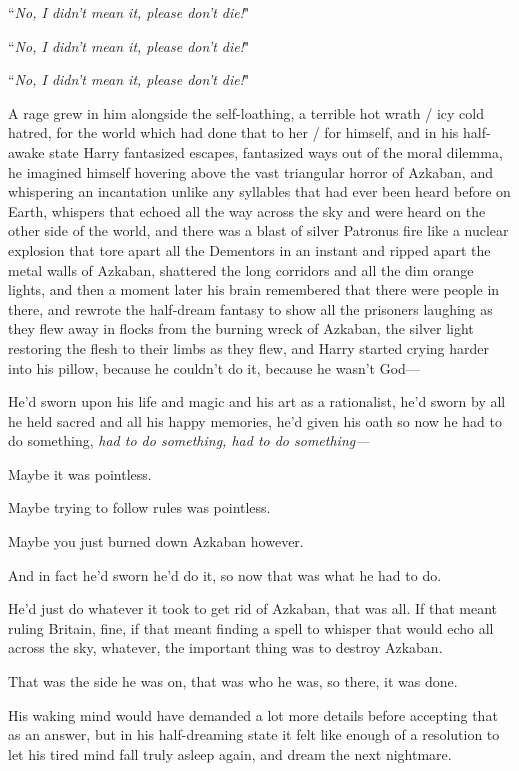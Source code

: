 ``\emph{No, I didn't mean it, please don't die!}"

``\emph{No, I didn't mean it, please don't die!}"

``\emph{No, I didn't mean it, please don't die!}"

A rage grew in him alongside the self-loathing, a terrible hot wrath / icy cold hatred, for the world which had done that to her / for himself, and in his half-awake state Harry fantasized escapes, fantasized ways out of the moral dilemma, he imagined himself hovering above the vast triangular horror of Azkaban, and whispering an incantation unlike any syllables that had ever been heard before on Earth, whispers that echoed all the way across the sky and were heard on the other side of the world, and there was a blast of silver Patronus fire like a nuclear explosion that tore apart all the Dementors in an instant and ripped apart the metal walls of Azkaban, shattered the long corridors and all the dim orange lights, and then a moment later his brain remembered that there were people in there, and rewrote the half-dream fantasy to show all the prisoners laughing as they flew away in flocks from the burning wreck of Azkaban, the silver light restoring the flesh to their limbs as they flew, and Harry started crying harder into his pillow, because he couldn't do it, because he wasn't God—

He'd sworn upon his life and magic and his art as a rationalist, he'd sworn by all he held sacred and all his happy memories, he'd given his oath so now he had to do something, \emph{had to do something, had to \emph{do something—}}

Maybe it was pointless.

Maybe trying to follow rules was pointless.

Maybe you just burned down Azkaban however.

And in fact he'd sworn he'd do it, so now that was what he had to do.

He'd just do whatever it took to get rid of Azkaban, that was all. If that meant ruling Britain, fine, if that meant finding a spell to whisper that would echo all across the sky, whatever, the important thing was to destroy Azkaban.

That was the side he was on, that was who he was, so there, it was done.

His waking mind would have demanded a lot more details before accepting that as an answer, but in his half-dreaming state it felt like enough of a resolution to let his tired mind fall truly asleep again, and dream the next nightmare.

